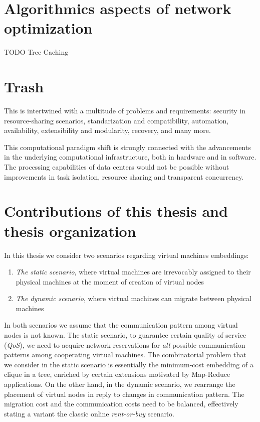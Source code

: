 \section{Algorithmics aspects of network optimization}

TODO Tree Caching

\section{Trash}


This is intertwined with a multitude of problems and requirements: security in resource-sharing scenarios, standarization and compatibility, automation, availability, extensibility and modularity, recovery, and many more.

This computational paradigm shift is strongly connected with the advancements 
in the underlying computational infrastructure, both in hardware and in software. 
The processing capabilities of data centers 
would not be possible without improvements in
task isolation, resource sharing and transparent concurrency.


\section{Contributions of this thesis and thesis organization}

In this thesis we consider two scenarios regarding virtual machines embeddings:
\begin{enumerate}
  \item \emph{The static scenario}, where virtual machines are irrevocably assigned to their physical machines at the moment of creation of virtual nodes
  \item \emph{The dynamic scenario}, where virtual machines can migrate between physical machines
\end{enumerate}

In both scenarios we assume that the communication pattern among virtual nodes is not known.
The static scenario, to guarantee certain quality of service (\emph{QoS}), we need to acquire network reservations for \emph{all} possible communication patterns among cooperating virtual machines.
The combinatorial problem that we consider in the static scenario is essentially the minimum-cost embedding of a clique in a tree, enriched by certain extensions motivated by Map-Reduce applications.
On the other hand, in the dynamic scenario, we rearrange the placement of virtual nodes in reply to changes in communication pattern.
The migration cost and the communication costs need to be balanced, effectively stating a variant the classic online \emph{rent-or-buy} scenario.

